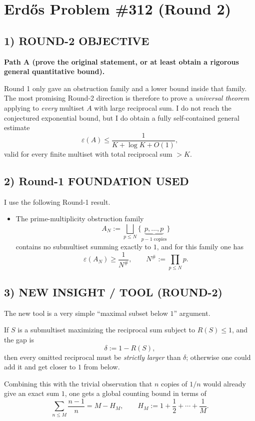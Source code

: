 \section{Erd\H{o}s Problem \#312 (Round 2)}

\subsection*{1) ROUND-2 OBJECTIVE}
\textbf{Path A (prove the original statement, or at least obtain a rigorous general quantitative bound).}

Round 1 only gave an obstruction family and a lower bound inside that family. The most promising Round-2 direction is therefore to prove a \emph{universal theorem} applying to \emph{every} multiset $A$ with large reciprocal sum. I do not reach the conjectured exponential bound, but I do obtain a fully self-contained general estimate
\[
\varepsilon(A)\le \frac{1}{K+\log K+O(1)},
\]
valid for every finite multiset with total reciprocal sum $>K$.

\subsection*{2) Round-1 FOUNDATION USED}
I use the following Round-1 result.

\begin{itemize}
\item The prime-multiplicity obstruction family
\[
A_N:=\bigsqcup_{p\le N}\{\underbrace{p,\ldots,p}_{p-1\text{ copies}}\}
\]
contains no submultiset summing exactly to $1$, and for this family one has
\[
\varepsilon(A_N)\ge \frac{1}{N^\#},
\qquad
N^\#:=\prod_{p\le N}p.
\]
\end{itemize}

\subsection*{3) NEW INSIGHT / TOOL (ROUND-2)}
The new tool is a very simple ``maximal subset below $1$'' argument.

If $S$ is a submultiset maximizing the reciprocal sum subject to $R(S)\le 1$, and the gap is
\[
\delta:=1-R(S),
\]
then every omitted reciprocal must be \emph{strictly larger} than $\delta$; otherwise one could add it and get closer to $1$ from below.

Combining this with the trivial observation that $n$ copies of $1/n$ would already give an exact sum $1$, one gets a global counting bound in terms of
\[
\sum_{n\le M}\frac{n-1}{n}=M-H_M,
\qquad
H_M:=1+\frac12+\cdots+\frac1M.
\]

